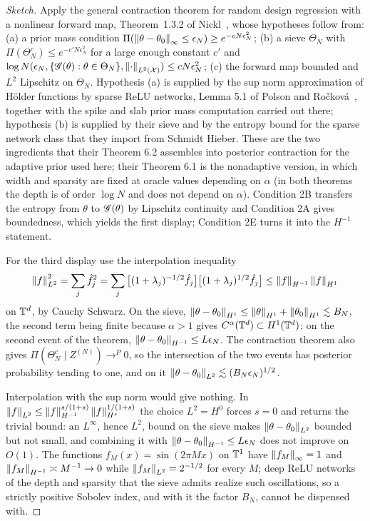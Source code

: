 \begin{proof}[Sketch]
Apply the general contraction theorem for random design regression with a nonlinear forward map, Theorem~1.3.2 of Nickl~\cite{nickl2023book}, whose hypotheses follow from: (a) a prior mass condition $\Pi(\left\|\theta-\theta_0\right\|_\infty\le\epsilon_N)\ge e^{-cN\epsilon_N^2}$; (b) a sieve $\Theta_N$ with $\Pi(\Theta_N^c)\le e^{-c'N\epsilon_N^2}$ for a large enough constant $c'$ and $\log N(\epsilon_N,\{\mathscr{G}(\theta):\theta\in\Theta_N\},\left\|\cdot\right\|_{L^2(\mathcal X)})\le cN\epsilon_N^2$; (c) the forward map bounded and $L^2$ Lipschitz on $\Theta_N$. Hypothesis (a) is supplied by the sup norm approximation of H\"older functions by sparse ReLU networks, Lemma 5.1 of Polson and Ro\v{c}kov\'a~\cite{polsonrockova2018}, together with the spike and slab prior mass computation carried out there; hypothesis (b) is supplied by their sieve and by the entropy bound for the sparse network class that they import from Schmidt Hieber. These are the two ingredients that their Theorem 6.2 assembles into posterior contraction for the adaptive prior used here; their Theorem 6.1 is the nonadaptive version, in which width and sparsity are fixed at oracle values depending on $\alpha$ (in both theorems the depth is of order $\log N$ and does not depend on $\alpha$). Condition 2B transfers the entropy from $\theta$ to $\mathscr{G}(\theta)$ by Lipschitz continuity and Condition 2A gives boundedness, which yields the first display; Condition 2E turns it into the $H^{-1}$ statement.

For the third display use the interpolation inequality
\[
\left\|f\right\|^2_{L^2}=\sum_j\hat f_j^2=\sum_j\big[(1+\lambda_j)^{-1/2}\hat f_j\big]\big[(1+\lambda_j)^{1/2}\hat f_j\big]\le\left\|f\right\|_{H^{-1}}\left\|f\right\|_{H^1}
\]
on $\mathbb{T}^d$, by Cauchy Schwarz. On the sieve, $\left\|\theta-\theta_0\right\|_{H^1}\le\left\|\theta\right\|_{H^1}+\left\|\theta_0\right\|_{H^1}\lesssim B_N$, the second term being finite because $\alpha>1$ gives $C^\alpha(\mathbb{T}^d)\subset H^1(\mathbb{T}^d)$; on the second event of the theorem, $\left\|\theta-\theta_0\right\|_{H^{-1}}\le L\epsilon_N$. The contraction theorem also gives $\Pi(\Theta_N^c\mid Z^{(N)})\to^P0$, so the intersection of the two events has posterior probability tending to one, and on it $\left\|\theta-\theta_0\right\|_{L^2}\lesssim(B_N\epsilon_N)^{1/2}$.

Interpolation with the sup norm would give nothing. In $\left\|f\right\|_{L^2}\le\left\|f\right\|_{H^{-1}}^{s/(1+s)}\left\|f\right\|_{H^s}^{1/(1+s)}$ the choice $L^2=H^0$ forces $s=0$ and returns the trivial bound: an $L^\infty$, hence $L^2$, bound on the sieve makes $\left\|\theta-\theta_0\right\|_{L^2}$ bounded but not small, and combining it with $\left\|\theta-\theta_0\right\|_{H^{-1}}\le L\epsilon_N$ does not improve on $O(1)$. The functions $f_M(x)=\sin(2\pi Mx)$ on $\mathbb{T}^1$ have $\left\|f_M\right\|_\infty=1$ and $\left\|f_M\right\|_{H^{-1}}\asymp M^{-1}\to0$ while $\left\|f_M\right\|_{L^2}=2^{-1/2}$ for every $M$; deep ReLU networks of the depth and sparsity that the sieve admits realize such oscillations, so a strictly positive Sobolev index, and with it the factor $B_N$, cannot be dispensed with.
\end{proof}

